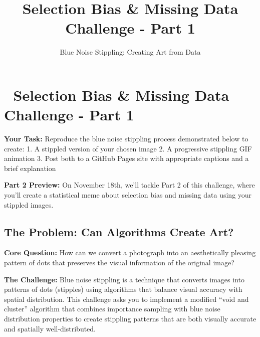 \documentclass[
  letterpaper,
  DIV=11,
  numbers=noendperiod]{scrartcl}
\title{Selection Bias \& Missing Data Challenge - Part 1}
\subtitle{Blue Noise Stippling: Creating Art from Data}
\author{}
\date{}
\begin{document}
\maketitle


\section{🎨 Selection Bias \& Missing Data Challenge - Part
1}\label{selection-bias-missing-data-challenge---part-1}

\begin{tcolorbox}[enhanced jigsaw, coltitle=black, breakable, colframe=quarto-callout-important-color-frame, opacitybacktitle=0.6, colbacktitle=quarto-callout-important-color!10!white, opacityback=0, toprule=.15mm, bottomtitle=1mm, colback=white, left=2mm, title=\textcolor{quarto-callout-important-color}{\faExclamation}\hspace{0.5em}{📊 Challenge Requirements}, toptitle=1mm, rightrule=.15mm, leftrule=.75mm, bottomrule=.15mm, titlerule=0mm, arc=.35mm]

\textbf{Your Task:} Reproduce the blue noise stippling process
demonstrated below to create: 1. A stippled version of your chosen image
2. A progressive stippling GIF animation 3. Post both to a GitHub Pages
site with appropriate captions and a brief explanation

\textbf{Part 2 Preview:} On November 18th, we'll tackle Part 2 of this
challenge, where you'll create a statistical meme about selection bias
and missing data using your stippled images.

\end{tcolorbox}

\subsection{The Problem: Can Algorithms Create
Art?}\label{the-problem-can-algorithms-create-art}

\textbf{Core Question:} How can we convert a photograph into an
aesthetically pleasing pattern of dots that preserves the visual
information of the original image?

\textbf{The Challenge:} Blue noise stippling is a technique that
converts images into patterns of dots (stipples) using algorithms that
balance visual accuracy with spatial distribution. This challenge asks
you to implement a modified ``void and cluster'' algorithm that combines
importance sampling with blue noise distribution properties to create
stippling patterns that are both visually accurate and spatially
well-distributed.
\end{document}
